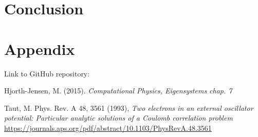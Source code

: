 \documentclass[12pt,a4paper,english]{article}
\begin{document}
\section{Conclusion}

\appendix
\section{Appendix}
\label{sect:appendix}
Link to GitHub repository:

\begin{thebibliography}{}
Hjorth-Jensen, M. (2015). \textit{Computational Physics, Eigensystems chap. 7}

Taut, M. Phys. Rev. A 48, 3561 (1993), \textit{Two electrons in an external oscillator potential: Particular analytic solutions of a Coulomb correlation problem}\\
\url{https://journals.aps.org/pdf/abstract/10.1103/PhysRevA.48.3561}
\end{thebibliography}
\end{document}
